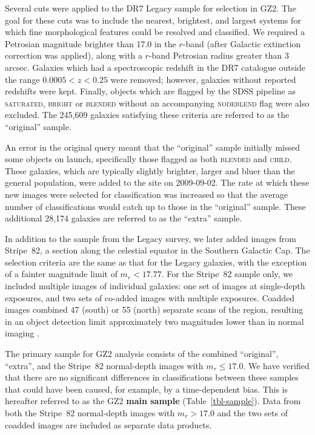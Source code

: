 \documentclass[useAMS,usenatbib]{mn2e}
\begin{document}
Several cuts were applied to the DR7 Legacy sample for selection in GZ2. The goal for these cuts was to include the nearest, brightest, and largest systems for which fine morphological features could be resolved and classified. We required a Petrosian magnitude brighter than 17.0 in the $r$-band (after Galactic extinction correction was applied), along with a $r$-band Petrosian radius greater than 3 arcsec. Galaxies which had a spectroscopic redshift in the DR7 catalogue outside the range $0.0005<z<0.25$ were removed; however, galaxies without reported redshifts were kept. Finally, objects which are flagged by the SDSS pipeline as \textsc{saturated}, \textsc{bright} or \textsc{blended} without an accompanying \textsc{nodeblend} flag were also excluded. The 245,609 galaxies satisfying these criteria are referred to as the ``original'' sample.  

An error in the original query meant that the ``original'' sample initially missed some objects on launch, specifically those flagged as both \textsc{blended} and \textsc{child}. These galaxies, which are typically slightly brighter, larger and bluer than the general population, were added to the site on 2009-09-02. The rate at which these new images were selected for classification was increased so that the average number of classifications would catch up to those in the ``original'' sample. These additional 28,174 galaxies are referred to as the ``extra'' sample. 

In addition to the sample from the Legacy survey, we later added images from Stripe~82, a section along the celestial equator in the Southern Galactic Cap. The selection criteria are the same as that for the Legacy galaxies, with the exception of a fainter magnitude limit of $m_r < 17.77$. For the Stripe~82 sample only, we included multiple images of individual galaxies: one set of images at single-depth exposures, and two sets of co-added images with multiple exposures. Coadded images combined 47 (south) or 55 (north) separate scans of the region, resulting in an object detection limit approximately two magnitudes lower than in normal imaging \citep{ann11}. 

The primary sample for GZ2 analysis consists of the combined ``original'', ``extra'', and the Stripe~82 normal-depth images with $m_r\leq17.0$. We have verified that there are no significant differences in classifications between these samples that could have been caused, for example, by a time-dependent bias. This is hereafter referred to as the GZ2 {\bf main sample} (Table~\ref{tbl-sample}). Data from both the Stripe~82 normal-depth images with $m_r>17.0$ and the two sets of coadded images are included as separate data products. 
\end{document}
